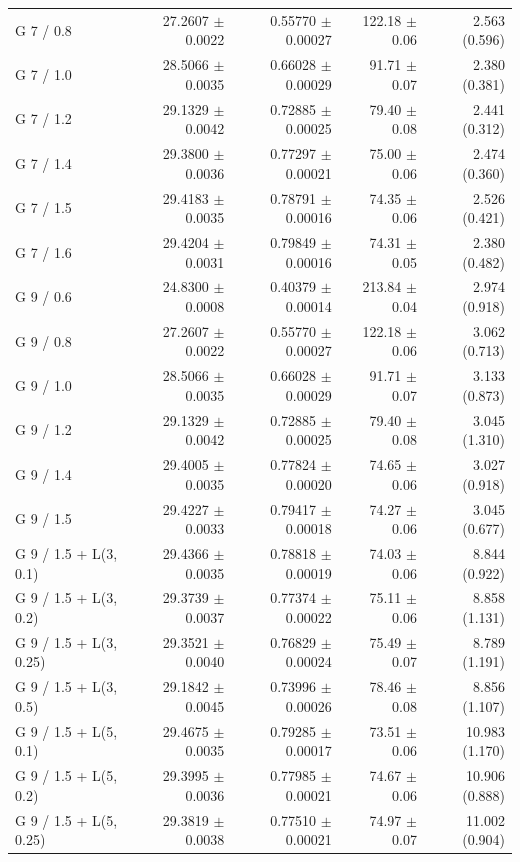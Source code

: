 \begin{longtable}{lrrrr}
G 7 / 0.8 & 27.2607 $\pm$ 0.0022 & 0.55770 $\pm$ 0.00027 & 122.18 $\pm$ 0.06 & 2.563 (0.596) \\
G 7 / 1.0 & 28.5066 $\pm$ 0.0035 & 0.66028 $\pm$ 0.00029 & 91.71 $\pm$ 0.07 & 2.380 (0.381) \\
G 7 / 1.2 & 29.1329 $\pm$ 0.0042 & 0.72885 $\pm$ 0.00025 & 79.40 $\pm$ 0.08 & 2.441 (0.312) \\
G 7 / 1.4 & 29.3800 $\pm$ 0.0036 & 0.77297 $\pm$ 0.00021 & 75.00 $\pm$ 0.06 & 2.474 (0.360) \\
G 7 / 1.5 & 29.4183 $\pm$ 0.0035 & 0.78791 $\pm$ 0.00016 & 74.35 $\pm$ 0.06 & 2.526 (0.421) \\
G 7 / 1.6 & 29.4204 $\pm$ 0.0031 & 0.79849 $\pm$ 0.00016 & 74.31 $\pm$ 0.05 & 2.380 (0.482) \\
G 9 / 0.6 & 24.8300 $\pm$ 0.0008 & 0.40379 $\pm$ 0.00014 & 213.84 $\pm$ 0.04 & 2.974 (0.918) \\
G 9 / 0.8 & 27.2607 $\pm$ 0.0022 & 0.55770 $\pm$ 0.00027 & 122.18 $\pm$ 0.06 & 3.062 (0.713) \\
G 9 / 1.0 & 28.5066 $\pm$ 0.0035 & 0.66028 $\pm$ 0.00029 & 91.71 $\pm$ 0.07 & 3.133 (0.873) \\
G 9 / 1.2 & 29.1329 $\pm$ 0.0042 & 0.72885 $\pm$ 0.00025 & 79.40 $\pm$ 0.08 & 3.045 (1.310) \\
G 9 / 1.4 & 29.4005 $\pm$ 0.0035 & 0.77824 $\pm$ 0.00020 & 74.65 $\pm$ 0.06 & 3.027 (0.918) \\
G 9 / 1.5 & 29.4227 $\pm$ 0.0033 & 0.79417 $\pm$ 0.00018 & 74.27 $\pm$ 0.06 & 3.045 (0.677) \\
G 9 / 1.5 + L(3, 0.1) & 29.4366 $\pm$ 0.0035 & 0.78818 $\pm$ 0.00019 & 74.03 $\pm$ 0.06 & 8.844 (0.922) \\
G 9 / 1.5 + L(3, 0.2) & 29.3739 $\pm$ 0.0037 & 0.77374 $\pm$ 0.00022 & 75.11 $\pm$ 0.06 & 8.858 (1.131) \\
G 9 / 1.5 + L(3, 0.25) & 29.3521 $\pm$ 0.0040 & 0.76829 $\pm$ 0.00024 & 75.49 $\pm$ 0.07 & 8.789 (1.191) \\
G 9 / 1.5 + L(3, 0.5) & 29.1842 $\pm$ 0.0045 & 0.73996 $\pm$ 0.00026 & 78.46 $\pm$ 0.08 & 8.856 (1.107) \\
G 9 / 1.5 + L(5, 0.1) & 29.4675 $\pm$ 0.0035 & 0.79285 $\pm$ 0.00017 & 73.51 $\pm$ 0.06 & 10.983 (1.170) \\
G 9 / 1.5 + L(5, 0.2) & 29.3995 $\pm$ 0.0036 & 0.77985 $\pm$ 0.00021 & 74.67 $\pm$ 0.06 & 10.906 (0.888) \\
G 9 / 1.5 + L(5, 0.25) & 29.3819 $\pm$ 0.0038 & 0.77510 $\pm$ 0.00021 & 74.97 $\pm$ 0.07 & 11.002 (0.904) \\

\end{longtable}

